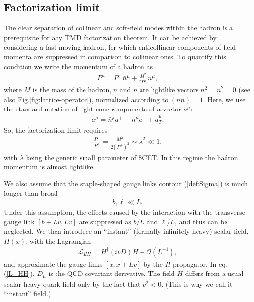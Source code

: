 \documentclass[a4paper, amsfonts, amssymb, amsmath, reprint, showkeys, nofootinbib, twoside]{revtex4-1}
\renewcommand{\(}{\left(}
\renewcommand{\)}{\right)}
\renewcommand{\[}{\left[}
\renewcommand{\]}{\right]}
\begin{document}
\subsection{Factorization limit} 

The clear separation of collinear and soft-field modes within the hadron is a prerequisite for any TMD factorization theorem. It can be achieved by considering a fast moving hadron, for which anticollinear components of field momenta are suppressed in comparison to collinear ones. To quantify this condition we write the momentum of a hadron as
\begin{eqnarray}
P^\mu=P^+ \bar n^\mu+\frac{M^2}{2P^+}n^\mu,
\end{eqnarray}
where $M$ is the mass of the hadron,  $n$ and $\bar n$ are lightlike vectors $n^2=\bar n^2=0$ (see also Fig.\ref{fig:lattice-operator}), normalized according to $(n\bar n)=1$.  Here, we use the standard notation of light-cone components of a vector $a^\mu$:
\begin{eqnarray}
a^\mu=\bar n^\mu a^++n^\mu a^-+a^\mu_T.
\end{eqnarray}
So, the factorization limit requires
\begin{eqnarray}\label{condition1}
\frac{P^-}{P^+}=\frac{M^2}{2(P^+)^2}\sim \lambda^2 \ll 1.
\end{eqnarray}
with $\lambda$ being the generic small parameter of SCET. In this regime the hadron momentum is almost lightlike. 

We also assume that the staple-shaped gauge links contour (\ref{def:Sigma}) is much longer than broad
\begin{eqnarray}\label{condition2}
b,\ell\ll L.
\end{eqnarray} 
Under this assumption, the effects caused by the interaction with the transverse gauge link $[b+Lv,Lv]$ are suppressed as $b/L$ and $\ell/L$, and thus can be neglected. We then introduce an ``instant'' (formally infinitely heavy)  scalar field, $H(x)$, with the Lagrangian
\begin{eqnarray}\label{L_HH}
\mathcal{L}_{HH}=H^\dagger (ivD)H+\mathcal{O}\(L^{-1}\),
\end{eqnarray}
and approximate the gauge links $[x,x+L v]$ by the $H$ propagator. In eq.(\ref{L_HH}), $D_\mu$ is the QCD covariant derivative. The field $H$ differs from a usual scalar heavy quark field \cite{Eichten:1989zv} only by the fact that $v^2<0$. (This is why we call it ``instant'' field.)
\end{document}
